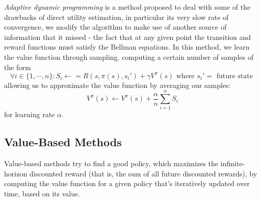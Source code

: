 \documentclass{article}
\begin{document}
\newline \newline
\textit{Adaptive dynamic programming} is a method proposed to deal with some of the drawbacks of direct utility estimation, in particular its very slow rate of convergence, we modify the algorithm to make use of another source of information that it missed - the fact that at any given point the transition and reward functions must satisfy the Bellman equations. In this method, we learn the value function through sampling, computing a certain number of samples of the form
$$ \forall i \in \{ 1, \cdots, n \}: S_i \gets = R(s, \pi(s), s_i') + \gamma V^\pi(s) \text{ where } s_i' = \text{ future state } $$
allowing us to approximate the value function by averaging our samples:
$$ V^\pi(s) \gets V^\pi(s) + \frac{\alpha}{n} \sum_{i = 1}^n S_i $$
for learning rate $ \alpha $.

\subsection{Value-Based Methods}
Value-based methods try to find a good policy, which maximizes the infinite-horizon discounted reward (that is, the sum of all future discounted rewards), by computing the value function for a given policy that's iteratively updated over time, based on its value.
\end{document}
